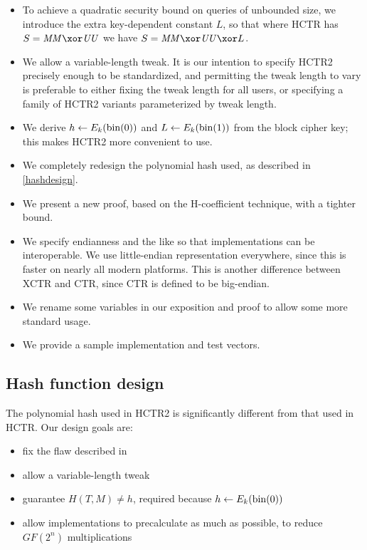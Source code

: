 \documentclass[hctr.tex]{subfiles}
\begin{document}
\begin{itemize}
    \item To achieve a quadratic security bound
    on queries of unbounded size,
    we introduce the extra
    key-dependent constant \(L\),
    so that where HCTR has \(S = \MM \xor \UU\)
    we have \(S = \MM \xor \UU \xor L\).
    \item We allow a variable-length tweak. It is our intention to specify
    HCTR2 precisely enough to be standardized, and permitting the tweak length
    to vary is preferable to either fixing the tweak length for all users,
    or specifying a family of HCTR2 variants parameterized by tweak length.
    \item We derive \(h \gets E_k(\operatorname{bin}(0))\)
    and \(L \gets E_k(\operatorname{bin}(1))\) from the block cipher key;
    this makes HCTR2 more convenient to use.
    \item We completely redesign the polynomial hash used, as described in
    \autoref{hashdesign}.
    \item We present a new proof, based on the H-coefficient technique,
    with a tighter bound.
    \item We specify endianness and the like so that implementations can be interoperable. We use little-endian representation everywhere,
    since this is faster on nearly all modern platforms.
    This is another difference between XCTR and CTR, since
    CTR is defined to be big-endian.
    \item We rename some variables in our exposition and proof to allow some more standard usage.
    \item We provide a sample implementation and test vectors.
\end{itemize}

\subsection{Hash function design}\label{hashdesign}

The polynomial hash used in HCTR2 is significantly different from
that used in HCTR. Our design goals are:

\begin{itemize}
    \item fix the flaw described in \cite{kumarhctr}
    \item allow a variable-length tweak
    \item guarantee \(H(T, M) \neq h\), required
    because \(h \gets E_k(\operatorname{bin}(0))\)
    \item allow implementations to precalculate as much as possible, to reduce \(GF(2^n)\) multiplications
\end{itemize}
\end{document}
